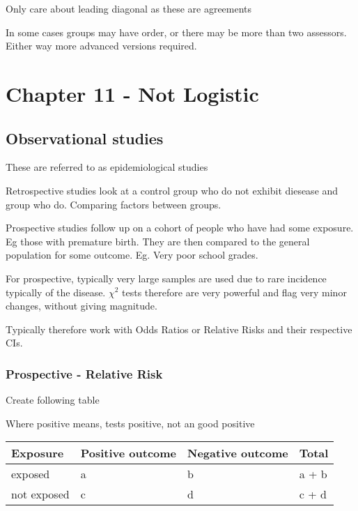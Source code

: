 \documentclass[
  letterpaper,
  DIV=11,
  numbers=noendperiod]{scrreprt}
\begin{document}
Only care about leading diagonal as these are agreements

In some cases groups may have order, or there may be more than two
assessors. Either way more advanced versions required.


\hypertarget{chapter-11---not-logistic}{%
\chapter{Chapter 11 - Not Logistic}\label{chapter-11---not-logistic}}

\hypertarget{observational-studies}{%
\section{Observational studies}\label{observational-studies}}

These are referred to as epidemiological studies

Retrospective studies look at a control group who do not exhibit
diesease and group who do. Comparing factors between groups.

Prospective studies follow up on a cohort of people who have had some
exposure. Eg those with premature birth. They are then compared to the
general population for some outcome. Eg. Very poor school grades.

For prospective, typically very large samples are used due to rare
incidence typically of the disease. \(\chi^2\) tests therefore are very
powerful and flag very minor changes, without giving magnitude.

Typically therefore work with Odds Ratios or Relative Risks and their
respective CIs.

\hypertarget{prospective---relative-risk}{%
\subsection{Prospective - Relative
Risk}\label{prospective---relative-risk}}

Create following table

Where positive means, tests positive, not an good positive

\begin{longtable}[]{@{}llll@{}}
\toprule()
Exposure & Positive outcome & Negative outcome & Total \\
\midrule()
\endhead
exposed & a & b & a + b \\
not exposed & c & d & c + d \\
\bottomrule()
\end{longtable}
\end{document}
